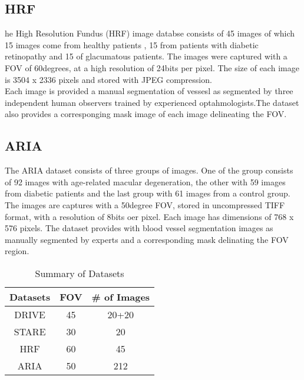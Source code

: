 \subsection{HRF}
he High Resolution Fundus (HRF) image databse consists of 45 images of which 15 images come from healthy patients , 15 from patients with diabetic retinopathy and 15 of glacumatous patients. The images were captured with a FOV of 60degrees, at a high resolution of 24bits per pixel. The size of each image is 3504 x 2336 pixels and stored with JPEG compression. \\

Each image is provided a manual segmentation of vessesl as segmented by three independent human observers trained by experienced optahmologists.The dataset also provides a corresponging mask image of each image delineating the FOV.

\subsection{ARIA}
The ARIA dataset consists of three groups of images. One of the group consists of 92 images with age-related macular degeneration, the other with 59 images from diabetic patients and the last group with 61 images from a control group.\\

The images are captures with a 50degree FOV, stored in uncompressed TIFF format, with a resolution of 8bits oer pixel. Each image has dimensions of 768 x 576 pixels. The dataset provides with blood vessel segmentation images as manually segmented by experts and a corresponding mask delinating the FOV region.



\begin{table}
\caption{Summary of Datasets}
\centering
\label{table:datasets}
\begin{tabular}{c c c }
\toprule
{Datasets} & {FOV} &{\# of Images}  \\ \hline

DRIVE & 45 & 20+20 \\

STARE& 30 & 20  \\

HRF & 60 & 45  \\

ARIA & 50 & 212 \\

\bottomrule
\end{tabular}
\end{table}
